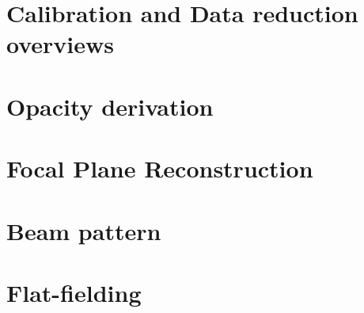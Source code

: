 \documentclass[a4paper, 11pt]{article} %
\begin{document}
\clearpage
\section{Calibration and Data reduction overviews}
\label{se:calib_pipeline}


\clearpage
\section{Opacity derivation}
\label{se:opacities}



\clearpage
\section{Focal Plane Reconstruction}
\label{se:fp_reconstruction}



\clearpage
\section{Beam pattern}
\label{se:beams}



\clearpage
\section{Flat-fielding}
\label{se:flat_field}

\end{document}
